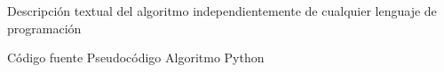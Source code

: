 
\question Descripción textual  del algoritmo  independientemente 
          de cualquier lenguaje  de programación

  \begin{oneparchoices}
    \choice Código fuente
    \CorrectChoice Pseudocódigo
    \choice Algoritmo
    \choice Python
  \end{oneparchoices}
